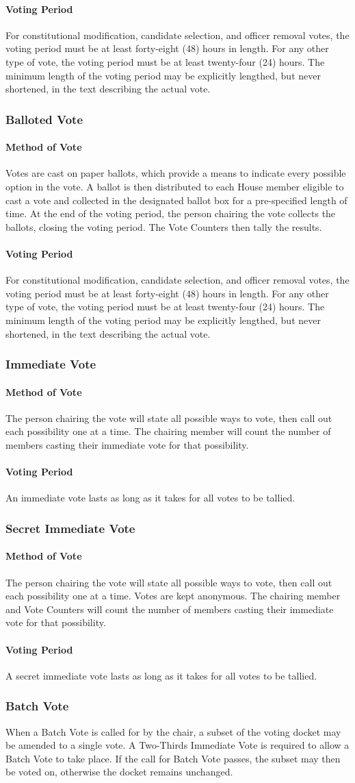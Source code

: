\documentclass{article}
\newcommand{\asubsection}[1]{\subsubsection{#1} \label{#1}}
\newcommand{\asubsubsection}[1]{\paragraph{#1} \label{#1}}
\begin{document}
\asubsubsection{Voting Period} 
For constitutional modification, candidate selection, and officer removal votes, the voting period must be at least forty-eight (48) hours in length. For any other type of vote, the voting period must be at least twenty-four (24) hours. The minimum length of the voting period may be explicitly lengthed, but never shortened, in the text describing the actual vote.
\asubsection{Balloted Vote}
\asubsubsection{Method of Vote} 
Votes are cast on paper ballots, which provide a means to indicate every possible option in the vote. A ballot is then distributed to each House member eligible to cast a vote and collected in the designated ballot box for a pre-specified length of time. At the end of the voting period, the person chairing the vote collects the ballots, closing the voting period. The Vote Counters then tally the results.
\asubsubsection{Voting Period} 
For constitutional modification, candidate selection, and officer removal votes, the voting period must be at least forty-eight (48) hours in length. For any other type of vote, the voting period must be at least twenty-four (24) hours. The minimum length of the voting period may be explicitly lengthed, but never shortened, in the text describing the actual vote.
\asubsection{Immediate Vote}
\asubsubsection{Method of Vote} 
The person chairing the vote will state all possible ways to vote, then call out each possibility one at a time. The chairing member will count the number of members casting their immediate vote for that possibility.
\asubsubsection{Voting Period} 
An immediate vote lasts as long as it takes for all votes to be tallied.
\asubsection{Secret Immediate Vote}
\asubsubsection{Method of Vote} 
The person chairing the vote will state all possible ways to vote, then call out each possibility one at a time. Votes are kept anonymous. The chairing member and Vote Counters will count the number of members casting their immediate vote for that possibility.
\asubsubsection{Voting Period}
A secret immediate vote lasts as long as it takes for all votes to be tallied.
\asubsection{Batch Vote}
When a Batch Vote is called for by the chair, a subset of the voting docket may be amended to a single vote. A Two-Thirds Immediate Vote is required to allow a Batch Vote to take place. If the call for Batch Vote passes, the subset may then be voted on, otherwise the docket remains unchanged.
\end{document}
